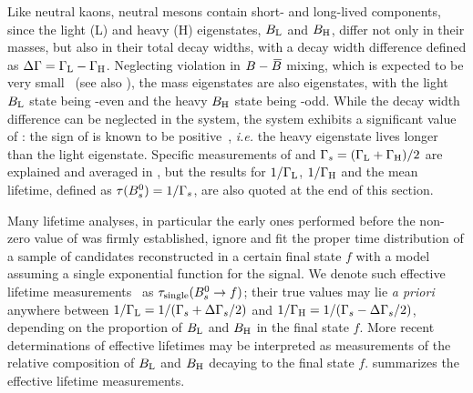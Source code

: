 %
%
%


Like neutral kaons, neutral \B mesons contain
short- and long-lived components, since the
light (L) and heavy (H)
eigenstates, $B_{\rm L}$ and $B_{\rm H}$, differ not only
in their masses, but also in their total decay widths,  
with a decay width difference defined as 
$\Delta\Gamma = \Gamma_{\rm L} - \Gamma_{\rm H}$. 
Neglecting \CP violation in $B-\kern 0.18em\overline{\kern -0.18em B}{}$ mixing, 
which is expected to be very
small~\cite{Lenz:2011ti,*Lenz:2006hd,Beneke:1998sy} (see also ),
the mass eigenstates are also \CP eigenstates,
with the light $B_{\rm L}$ state being \CP-even 
and the heavy $B_{\rm H}$ state being \CP-odd. 
While the decay width difference \DGd can be neglected in the \Bd system, 
the \Bs system exhibits a significant
value of \DGs: the sign of \DGs is known 
to be positive~\cite{Aaij:2012eq}, {\em i.e.}
the heavy eigenstate lives longer than the light eigenstate. 
Specific measurements of \DGs and 
$\Gamma_{s} = (\Gamma_{\rm L} + \Gamma_{\rm H})/2$ are explained
and averaged in , but the results for
$1/\Gamma_{\rm L}$, $1/\Gamma_{\rm H}$ and
the mean \Bs lifetime, defined as $\tau(B^0_s) = 1/\Gamma_{s}$,
are also quoted at the end of this section. 

Many \Bs lifetime analyses, in particular the early 
ones performed before the non-zero value of \DGs was 
firmly established, ignore \DGs and fit the proper time 
distribution of a sample of \Bs candidates 
reconstructed in a certain final state $f$
with a model assuming a single exponential function 
for the signal. We denote such {\rm effective lifetime}
measurements~\cite{Fleischer:2011cw} as $\tau_{\rm single}(B^0_s\to f)$; 
their true values may lie {\em a priori} anywhere
between $1/\Gamma_{\rm L} = 1/(\Gamma_{s}+\Delta\Gamma_{s}/2)$ and
$1/\Gamma_{\rm H}= 1/(\Gamma_{s}-\Delta\Gamma_{s}/2)$, 
depending on the proportion of $B_{\rm L}$ and $B_{\rm H}$
in the final state $f$. 
More recent determinations of effective lifetimes may be interpreted as
measurements of the relative composition of $B_{\rm L}$ and $B_{\rm H}$
decaying to the final state $f$. 
 summarizes the effective 
lifetime measurements.

